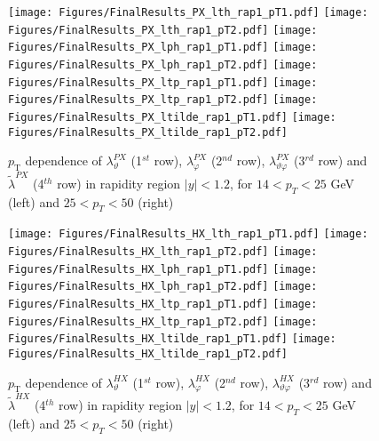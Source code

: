 \documentclass[12pt]{article}
\newcommand{\pT}{p_\mathrm{T}}
\newcommand{\absy}{\left |  y \right |}
\newcommand{\lamthHX}{\lambda^{\scriptscriptstyle HX}_\vartheta}
\newcommand{\lamphHX}{\lambda^{\scriptscriptstyle HX}_\varphi}
\newcommand{\lamthphHX}{\lambda^{\scriptscriptstyle HX}_{\vartheta \varphi}}
\newcommand{\lamtildeHX}{\tilde{\lambda}^{\scriptscriptstyle HX}}
\newcommand{\lamthPX}{\lambda^{\scriptscriptstyle PX}_\vartheta}
\newcommand{\lamphPX}{\lambda^{\scriptscriptstyle PX}_\varphi}
\newcommand{\lamthphPX}{\lambda^{\scriptscriptstyle PX}_{\vartheta \varphi}}
\newcommand{\lamtildePX}{\tilde{\lambda}^{\scriptscriptstyle PX}}
\begin{document}



\begin{figure}[htbp]
\centering
\texttt{[image: Figures/FinalResults\_PX\_lth\_rap1\_pT1.pdf]}
\texttt{[image: Figures/FinalResults\_PX\_lth\_rap1\_pT2.pdf]}
\texttt{[image: Figures/FinalResults\_PX\_lph\_rap1\_pT1.pdf]}
\texttt{[image: Figures/FinalResults\_PX\_lph\_rap1\_pT2.pdf]}
\texttt{[image: Figures/FinalResults\_PX\_ltp\_rap1\_pT1.pdf]}
\texttt{[image: Figures/FinalResults\_PX\_ltp\_rap1\_pT2.pdf]}
\texttt{[image: Figures/FinalResults\_PX\_ltilde\_rap1\_pT1.pdf]}
\texttt{[image: Figures/FinalResults\_PX\_ltilde\_rap1\_pT2.pdf]}
\caption{$\pT$ dependence of $\lamthPX$
(1$^{st}$ row), $\lamphPX$ (2$^{nd}$ row), $\lamthphPX$ (3$^{rd}$ row) and 
$\lamtildePX$ (4$^{th}$ row) in rapidity region $\absy<1.2$, for $14 < p_{T} < 25$ GeV (left) and $25 < p_{T} < 50$ (right)}
\end{figure}
\clearpage







\begin{figure}[htbp]
\centering
\texttt{[image: Figures/FinalResults\_HX\_lth\_rap1\_pT1.pdf]}
\texttt{[image: Figures/FinalResults\_HX\_lth\_rap1\_pT2.pdf]}
\texttt{[image: Figures/FinalResults\_HX\_lph\_rap1\_pT1.pdf]}
\texttt{[image: Figures/FinalResults\_HX\_lph\_rap1\_pT2.pdf]}
\texttt{[image: Figures/FinalResults\_HX\_ltp\_rap1\_pT1.pdf]}
\texttt{[image: Figures/FinalResults\_HX\_ltp\_rap1\_pT2.pdf]}
\texttt{[image: Figures/FinalResults\_HX\_ltilde\_rap1\_pT1.pdf]}
\texttt{[image: Figures/FinalResults\_HX\_ltilde\_rap1\_pT2.pdf]}
\caption{$\pT$ dependence of $\lamthHX$
(1$^{st}$ row), $\lamphHX$ (2$^{nd}$ row), $\lamthphHX$ (3$^{rd}$ row) and 
$\lamtildeHX$ (4$^{th}$ row) in rapidity region $\absy<1.2$, for $14 < p_{T} < 25$ GeV (left) and $25 < p_{T} < 50$ (right)}
\end{figure}
\clearpage



\end{document}
